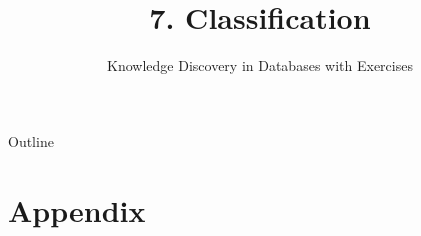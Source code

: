 \documentclass[aspectratio=169,t,table]{beamer}
\title[KDDmUe~7.~Classification]{7. Classification} %
\subtitle{Knowledge Discovery in Databases with Exercises}
\begin{document}
\maketitle

{ %
	\begin{frame}[noframenumbering]{Outline}
		\tableofcontents

	\end{frame}
}









\section*{Appendix}


\end{document}
